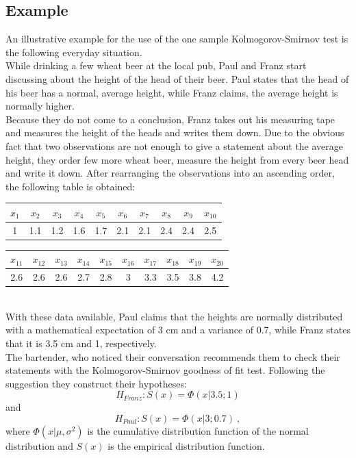 \documentclass{article}
\theoremstyle{definition}
\begin{document}
\subsection{Example}
An illustrative example for the use of the one sample Kolmogorov-Smirnov test is the following everyday situation.\\
While drinking a few wheat beer at the local pub, Paul and Franz start discussing about the height of the head of their beer.
Paul states that the head of his beer has a normal, average height, while Franz claims, the average height is normally higher.\\
Because they do not come to a conclusion, Franz takes out his measuring tape and measures the height of the heads and writes them down. Due to the obvious fact that two observations are not enough to give a statement about the average height, they order few more wheat beer, measure the height from every beer head and write it down.
After rearranging the observations into an ascending order, the following table is obtained:
\begin{table}[h]
\center
\begin{tabular}{c|c|c|c|c|c|c|c|c|c}
$x_1$	&$x_2$	&$x_3$	&$x_4$	&$x_5$	&$x_6$	&$x_7$	&$x_8$	&$x_9$	&$x_{10}$\\
\hline
1	&1.1	&1.2	&1.6	&1.7	&2.1	&2.1	&2.4	&2.4	&2.5	\\
\end{tabular}
\begin{tabular}{c|c|c|c|c|c|c|c|c|c}
$x_{11}$	&$x_{12}$	&$x_{13}$	&$x_{14}$	&$x_{15}$	&$x_{16}$	&$x_{17}$	&$x_{18}$	&$x_{19}$	&$x_{20}$\\
\hline
2.6	&2.6	&2.6	&2.7	&2.8	&3	&3.3	&3.5	&3.8	&4.2\\
\end{tabular}
\end{table}
\\
With these data available, Paul claims that the heights are normally distributed with a mathematical expectation of 3 cm and a variance of 0.7, while Franz states that it is 3.5 cm and 1, respectively.\\
The bartender, who noticed their conversation recommends them to check their statements with the Kolmogorov-Smirnov goodness of fit test.
Following the suggestion they construct their hypotheses:
$$H_{Franz} : S(x) = \Phi (x|3.5;1)$$
and
$$H_{Paul} : S(x) = \Phi (x|3;0.7)~,$$
where $\Phi(x|\mu,\sigma^2)$ is the cumulative distribution function of the normal distribution and $S(x)$ is the empirical distribution function.\\
\end{document}
